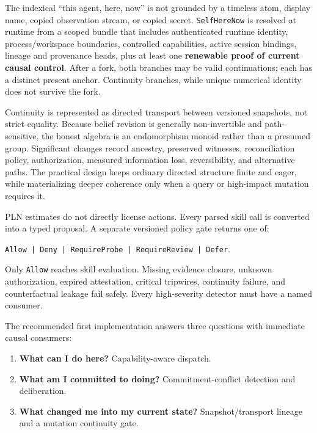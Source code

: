 \documentclass[11pt,oneside]{report}
\newcommand{\SelfHereNow}{\texttt{SelfHereNow}}
\begin{document}
The indexical ``this agent, here, now'' is not grounded by a timeless atom, display name, copied observation stream, or copied secret. \SelfHereNow{} is resolved at runtime from a scoped bundle that includes authenticated runtime identity, process/workspace boundaries, controlled capabilities, active session bindings, lineage and provenance heads, plus at least one \textbf{renewable proof of current causal control}. After a fork, both branches may be valid continuations; each has a distinct present anchor. Continuity branches, while unique numerical identity does not survive the fork.

Continuity is represented as directed transport between versioned snapshots, not strict equality. Because belief revision is generally non-invertible and path-sensitive, the honest algebra is an endomorphism monoid rather than a presumed group. Significant changes record ancestry, preserved witnesses, reconciliation policy, authorization, measured information loss, reversibility, and alternative paths. The practical design keeps ordinary directed structure finite and eager, while materializing deeper coherence only when a query or high-impact mutation requires it.

PLN estimates do not directly license actions. Every parsed skill call is converted into a typed proposal. A separate versioned policy gate returns one of:

\begin{center}
\texttt{Allow | Deny | RequireProbe | RequireReview | Defer}.
\end{center}

Only \texttt{Allow} reaches skill evaluation. Missing evidence closure, unknown authorization, expired attestation, critical tripwires, continuity failure, and counterfactual leakage fail safely. Every high-severity detector must have a named consumer.

The recommended first implementation answers three questions with immediate causal consumers:

\begin{enumerate}
  \item \textbf{What can I do here?} Capability-aware dispatch.
  \item \textbf{What am I committed to doing?} Commitment-conflict detection and deliberation.
  \item \textbf{What changed me into my current state?} Snapshot/transport lineage and a mutation continuity gate.
\end{enumerate}
\end{document}
